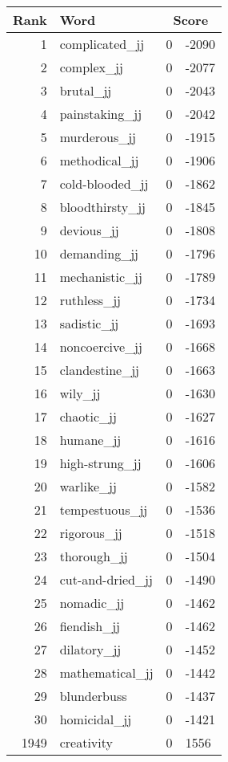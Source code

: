 \begin{longtable}[!htbp]{| rlr@{.}l |}
    \hline
    \textbf{Rank} & \textbf{Word} & \multicolumn{2}{c|}{\textbf{Score}} \\
    \hline
    \endhead
    1 & complicated\_jj & 0 & -2090 \\
    2 & complex\_jj & 0 & -2077 \\
    3 & brutal\_jj & 0 & -2043 \\
    4 & painstaking\_jj & 0 & -2042 \\
    5 & murderous\_jj & 0 & -1915 \\
    6 & methodical\_jj & 0 & -1906 \\
    7 & cold-blooded\_jj & 0 & -1862 \\
    8 & bloodthirsty\_jj & 0 & -1845 \\
    9 & devious\_jj & 0 & -1808 \\
    10 & demanding\_jj & 0 & -1796 \\
    11 & mechanistic\_jj & 0 & -1789 \\
    12 & ruthless\_jj & 0 & -1734 \\
    13 & sadistic\_jj & 0 & -1693 \\
    14 & noncoercive\_jj & 0 & -1668 \\
    15 & clandestine\_jj & 0 & -1663 \\
    16 & wily\_jj & 0 & -1630 \\
    17 & chaotic\_jj & 0 & -1627 \\
    18 & humane\_jj & 0 & -1616 \\
    19 & high-strung\_jj & 0 & -1606 \\
    20 & warlike\_jj & 0 & -1582 \\
    21 & tempestuous\_jj & 0 & -1536 \\
    22 & rigorous\_jj & 0 & -1518 \\
    23 & thorough\_jj & 0 & -1504 \\
    24 & cut-and-dried\_jj & 0 & -1490 \\
    25 & nomadic\_jj & 0 & -1462 \\
    26 & fiendish\_jj & 0 & -1462 \\
    27 & dilatory\_jj & 0 & -1452 \\
    28 & mathematical\_jj & 0 & -1442 \\
    29 & blunderbuss & 0 & -1437 \\
    30 & homicidal\_jj & 0 & -1421 \\
    1949 & creativity & 0 & 1556 \\

\end{longtable}
